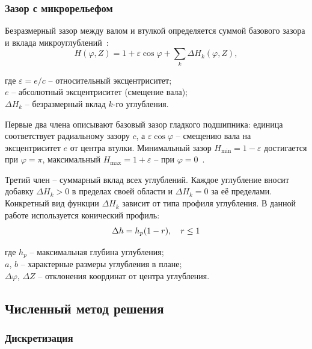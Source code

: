 \subsubsection{Зазор с микрорельефом}

Безразмерный зазор между валом и втулкой определяется суммой базового зазора и вклада микроуглублений~\cite{tala2012}:
\begin{equation}
    H(\varphi, Z) = 1 + \varepsilon\cos\varphi + \textstyle\sum_k \Delta H_k(\varphi, Z),
    \label{eq:clearance}
\end{equation}

\noindent где $\varepsilon = e/c$ -- относительный эксцентриситет;\\
\hphantom{где }$e$ -- абсолютный эксцентриситет (смещение вала);\\
\hphantom{где }$\Delta H_k$ -- безразмерный вклад $k$-го углубления.

Первые два члена описывают базовый зазор гладкого подшипника: единица соответствует радиальному зазору $c$, а $\varepsilon\cos\varphi$ -- смещению вала на эксцентриситет $e$ от центра втулки. Минимальный зазор $H_{\min} = 1 - \varepsilon$ достигается при $\varphi = \pi$, максимальный $H_{\max} = 1 + \varepsilon$ -- при $\varphi = 0$~\cite{pinkus}.

Третий член -- суммарный вклад всех углублений. Каждое углубление вносит добавку $\Delta H_k > 0$ в пределах своей области и $\Delta H_k = 0$ за её пределами. Конкретный вид функции $\Delta H_k$ зависит от типа профиля углубления. В данной работе используется конический профиль:
\begin{equation}
    \Delta h = h_p (1 - r), \quad r \leq 1
    \label{eq:dimple_profile}
\end{equation}

\noindent где $h_p$ -- максимальная глубина углубления;\\
\hphantom{где }$a$, $b$ -- характерные размеры углубления в плане;\\
\hphantom{где }$\Delta\varphi$, $\Delta Z$ -- отклонения координат от центра углубления.

\subsection{Численный метод решения}

\subsubsection{Дискретизация}

